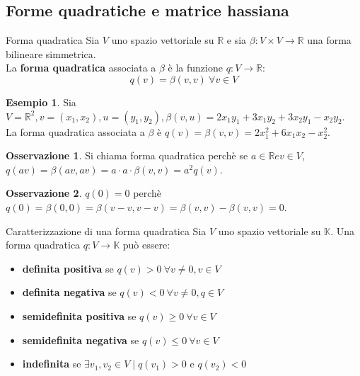 \documentclass[a4paper]{article}
\theoremstyle{definition}
\newtheorem*{oss}{Osservazione}
\newtheorem*{es}{Esempio}
\begin{document}
	\subsection{Forme quadratiche e matrice hassiana}
	
	\begin{deff}{Forma quadratica}{}
		Sia $V$ uno spazio vettoriale su $\mathbb{R}$ e sia $\beta: V \times V \to \mathbb{R}$ una forma bilineare simmetrica. \\
		La \textbf{forma quadratica} associata a $\beta$ è la funzione $q: V \to \mathbb{R}$:
		\[ q(v) = \beta(v, v) \ \forall v \in V \]
	\end{deff}

	\begin{es}
		Sia $V = \mathbb{R}^2, v = (x_1, x_2), u = (y_1, y_2), \beta(v, u) = 2x_1y_1 + 3x_1y_2 + 3x_2y_1 - x_2y_2$. \\
		La forma quadratica associata a $\beta$ è $q(v) = \beta(v, v) = 2x_1^2 + 6x_1x_2 - x_2^2$.
	\end{es}

	\begin{oss}
		Si chiama forma quadratica perchè se $a \in \mathbb{R} e v \in V$, $q(av) = \beta(av, av) = a \cdot a \cdot \beta(v, v) = a^2q(v)$.
	\end{oss}

	\begin{oss}
		$q(0) = 0$ perchè $q(0) = \beta(0, 0) = \beta(v - v, v - v) = \beta(v, v) - \beta(v, v) = 0$.
	\end{oss}

	\begin{deff}{Caratterizzazione di una forma quadratica}{}
		Sia $V$ uno spazio vettoriale su $\mathbb{K}$. Una forma quadratica $q: V \to \mathbb{K}$ può essere:
		\begin{itemize}
			\item \textbf{definita positiva} se $q(v) > 0 \ \forall v \ne 0, v \in V$
			\item \textbf{definita negativa} se $q(v) < 0 \ \forall v \ne 0, q \in V$
			\item \textbf{semidefinita positiva} se $q(v) \ge 0 \ \forall v \in V$
			\item \textbf{semidefinita negativa} se $q(v) \le 0 \ \forall v \in V$
			\item \textbf{indefinita} se $\exists v_1, v_2 \in V \mid q(v_1) > 0$ e $q(v_2) < 0$
		\end{itemize}
	\end{deff}
\end{document}
